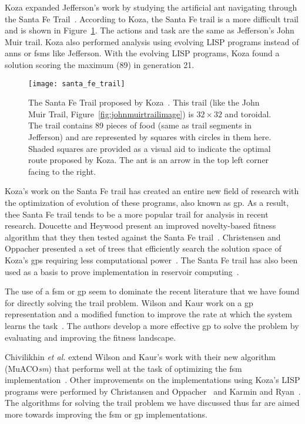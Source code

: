 Koza expanded Jefferson's work by studying the artificial ant navigating through the Santa Fe Trail~\cite{Koza1992-xs}. According to Koza, the Santa Fe trail is a more difficult trail and is shown in Figure~\ref{fig:santa_fe_trail_image}. The actions and task are the same as Jefferson's John Muir trail. Koza also performed analysis using evolving LISP programs instead of \glspl{ann} or \glspl{fsm} like Jefferson. With the evolving LISP programs, Koza found a solution scoring the maximum (89) in generation 21.

\begin{figure}[tbp]
\centering
\texttt{[image: santa\_fe\_trail]}
\caption[Santa Fe Trail]{The Santa Fe Trail proposed by Koza~\cite{Koza1992-xs}. This trail (like the John Muir Trail, Figure~\ref{fig:johnmuirtrailimage}) is $32 \times 32$ and toroidal. The trail contains 89 pieces of food (same as trail segments in Jefferson) and are represented by squares with circles in them here. Shaded squares are provided as a visual aid to indicate the optimal route proposed by Koza. The ant is an arrow in the top left corner facing to the right.}
\label{fig:santa_fe_trail_image}
\end{figure}

Koza's work on the Santa Fe trail has created an entire new field of research with the optimization of evolution of these programs, also known as \gls{gp}. As a result, thee Santa Fe trail tends to be a more popular trail for analysis in recent research. Doucette and Heywood present an improved novelty-based fitness algorithm that they then tested against the Santa Fe trail~\cite{Doucette2010-yc}. Christensen and Oppacher presented a set of trees that efficiently search the solution space of Koza's \glspl{gp} requiring less computational power~\cite{Christensen2007-vj}. The Santa Fe trail has also been used as a basis to prove implementation in reservoir computing~\cite{Gargesa2013-rx}.

The use of a \gls{fsm} or \gls{gp} seem to dominate the recent literature that we have found for directly solving the trail problem. Wilson and Kaur work on a \gls{gp} representation and a modified function to improve the rate at which the system learns the task~\cite{Wilson2013-vt}. The authors develop a more effective \gls{gp} to solve the problem by evaluating and improving the fitness landscape.

Chivilikhin \textit{et al.} extend Wilson and Kaur's work with their new algorithm (MuACO\textit{sm}) that performs well at the task of optimizing the \gls{fsm} implementation~\cite{Chivilikhin2013-sw}. Other improvements on the implementations using Koza's LISP programs were performed by Christansen and Oppacher~\cite{Christensen2007-vj} and Karmin and Ryan~\cite{Karim2012-ik}. The algorithms for solving the trail problem we have discussed thus far are aimed more towards improving the \gls{fsm} or \gls{gp} implementations.

